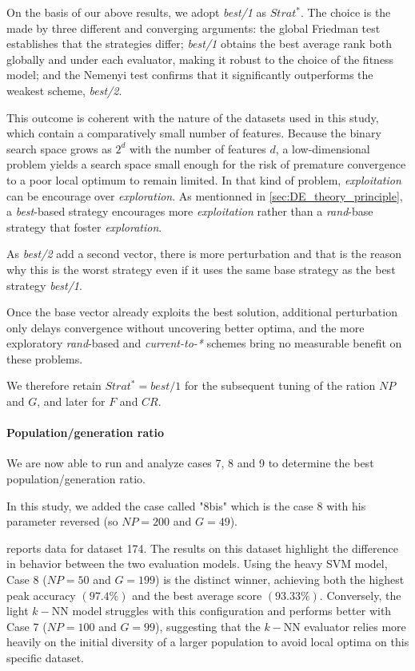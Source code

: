 \documentclass[12pt, openany]{article}
\begin{document}
On the basis of our above results, we adopt \textit{best/1} as $Strat^*$. The choice is the made by three different and converging arguments: the global Friedman test establishes that the strategies differ; \textit{best/1} obtains the best average rank both globally and under each evaluator, making it robust to the choice of the fitness model; and the Nemenyi test confirms that it significantly outperforms the weakest scheme, \textit{best/2}.

This outcome is coherent with the nature of the datasets used in this study, which contain a comparatively small number of features. Because the binary search space grows as $2^d$ with the number of features $d$, a low-dimensional problem yields a search space small enough for the risk of premature convergence to a poor local optimum to remain limited. In that kind of problem, \emph{exploitation} can be encourage over \emph{exploration}. As mentionned in \ref{sec:DE_theory_principle}, a \textit{best}-based strategy encourages more \emph{exploitation} rather than a \textit{rand}-base strategy that foster \emph{exploration}.

As \textit{best/2} add a second vector, there is more perturbation and that is the reason why this is the worst strategy even if it uses the same base strategy as the best strategy \textit{best/1}.

Once the base vector already exploits the best solution, additional perturbation only delays convergence without uncovering better optima, and the more exploratory \textit{rand}-based and \textit{current-to-*} schemes bring no measurable benefit on these problems.

We therefore retain $\boxed{Strat^*=\textit{best/1}}$ for the subsequent tuning of the ration $NP$ and $G$, and later for $F$ and $CR$.


\paragraph{Population/generation ratio} We are now able to run and analyze cases 7, 8 and 9 to determine the best population/generation ratio.

In this study, we added the case called "8bis" which is the case 8 with his parameter reversed (so $NP=200$ and $G=49$).

 reports data for dataset 174. The results on this dataset highlight the difference in behavior between the two evaluation models. Using the heavy SVM model, Case 8 ($NP=50$ and $G=199$) is the distinct winner, achieving both the highest peak accuracy $(97.4\%)$ and the best average score $(93.33\%)$. Conversely, the light $k-$NN model struggles with this configuration and performs better with Case 7 ($NP=100$ and $G=99$), suggesting that the $k-$NN evaluator relies more heavily on the initial diversity of a larger population to avoid local optima on this specific dataset.
\end{document}
